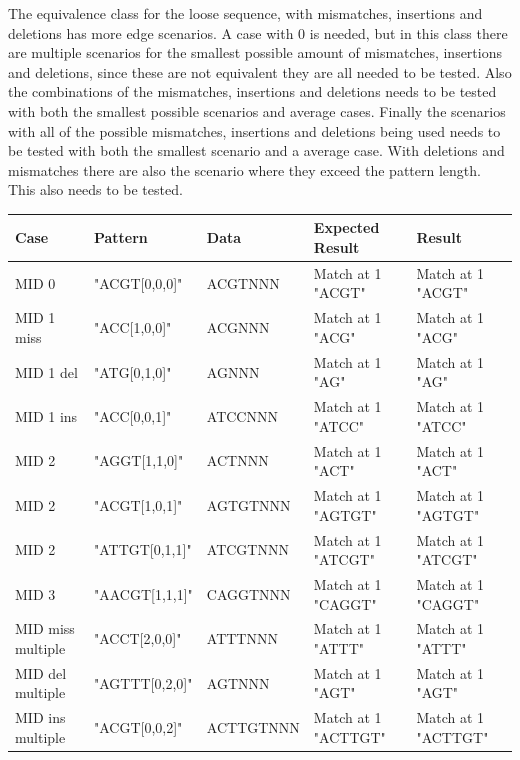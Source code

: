 \documentclass[12pt]{article}
\begin{document}
The equivalence class for the loose sequence, with mismatches, insertions and deletions has more edge scenarios.
A case with 0 is needed, but in this class there are multiple scenarios for the smallest possible amount of 
mismatches, insertions and deletions, since these are not equivalent they are all needed to be tested. Also the 
combinations of the mismatches, insertions and deletions needs to be tested with both the smallest possible
scenarios and average cases. Finally the scenarios with all of the possible mismatches, insertions and deletions 
being used needs to be tested with both the smallest scenario and a average case.
With deletions and mismatches there are also the scenario where they exceed the pattern length. This also needs to 
be tested.
\begin{table}[H]
\begin{tabular}{p{4cm}|p{3.6cm}|p{2.5cm}|p{2.2cm}|p{2.2cm}}
Case 			& Pattern & Data & Expected Result & Result \\ \hline
\rowcolor{lightgreen}
MID 0			& "ACGT[0,0,0]" & ACGTNNN & Match at 1 "ACGT" & Match at 1 "ACGT" \\ \hline
\rowcolor{lightgreen}
MID 1 miss		& "ACC[1,0,0]" & ACGNNN & Match at 1 "ACG" & Match at 1 "ACG" \\ \hline
\rowcolor{lightgreen}
MID 1 del		& "ATG[0,1,0]" & AGNNN & Match at 1 "AG" & Match at 1 "AG" \\ \hline
\rowcolor{lightgreen}
MID 1 ins		& "ACC[0,0,1]" & ATCCNNN & Match at 1 "ATCC" & Match at 1 "ATCC"\\ \hline
\rowcolor{lightgreen}
MID 2 			& "AGGT[1,1,0]" & ACTNNN & Match at 1 "ACT" & Match at 1 "ACT" \\ \hline
\rowcolor{lightgreen}
MID 2			& "ACGT[1,0,1]" & AGTGTNNN & Match at 1 "AGTGT" & Match at 1 "AGTGT" \\ \hline
\rowcolor{lightgreen}
MID 2 			& "ATTGT[0,1,1]" & ATCGTNNN & Match at 1 "ATCGT" & Match at 1 "ATCGT" \\ \hline
\rowcolor{lightgreen}
MID 3			& "AACGT[1,1,1]" & CAGGTNNN & Match at 1 "CAGGT" & Match at 1 "CAGGT" \\ \hline
\rowcolor{lightgreen}
MID miss multiple & "ACCT[2,0,0]" & ATTTNNN & Match at 1 "ATTT" & Match at 1 "ATTT" \\ \hline
\rowcolor{lightgreen}
MID del multiple & "AGTTT[0,2,0]" & AGTNNN & Match at 1 "AGT" & Match at 1 "AGT" \\ \hline
\rowcolor{lightgreen}
MID ins multiple & "ACGT[0,0,2]" & ACTTGTNNN & Match at 1 "ACTTGT" & Match at 1 "ACTTGT" \\ \hline 

\end{tabular}
\end{table}
\end{document}
